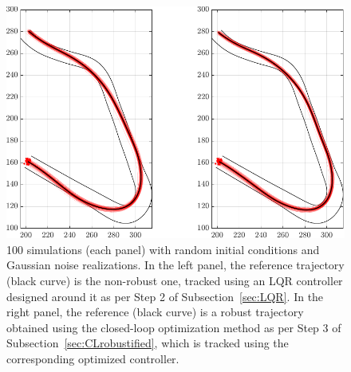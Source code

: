 \begin{figure}
	\centering
	\includegraphics{Fig/olcl_traj_strings.pdf}
	\caption{100 simulations (each panel) with random initial conditions and Gaussian noise realizations. In the left panel, the reference trajectory (black curve) is the non-robust one, tracked using an LQR controller designed around it as per Step 2 of Subsection~\ref{sec:LQR}. In the right panel, the reference (black curve) is a robust trajectory obtained using the closed-loop optimization method as per Step 3 of Subsection~\ref{sec:CLrobustified}, which is tracked using the corresponding optimized controller.}
	\label{fig:traj_strings}
\end{figure}